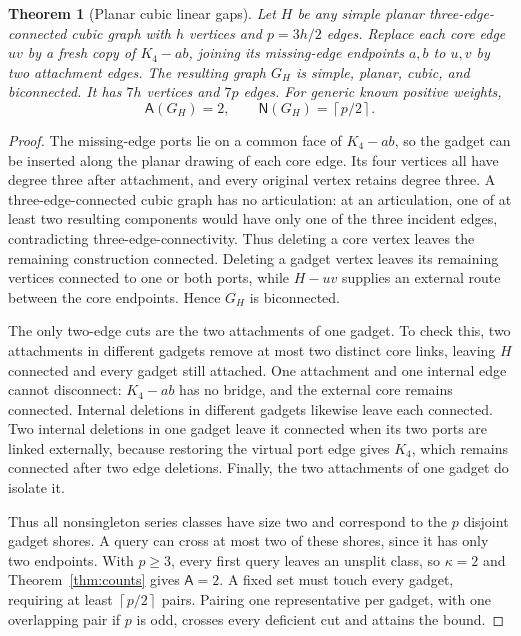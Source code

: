 \documentclass[11pt,letterpaper]{article}
\newtheorem{theorem}{Theorem}
\newcommand{\ceil}[1]{\left\lceil #1\right\rceil}
\newcommand{\A}{\mathsf A}
\newcommand{\N}{\mathsf N}
\begin{document}
\begin{theorem}[Planar cubic linear gaps]\label{thm:cubic}
Let $H$ be any simple planar three-edge-connected cubic graph with $h$ vertices and $p=3h/2$ edges. Replace each core edge $uv$ by a fresh copy of $K_4-ab$, joining its missing-edge endpoints $a,b$ to $u,v$ by two attachment edges. The resulting graph $G_H$ is simple, planar, cubic, and biconnected. It has $7h$ vertices and $7p$ edges. For generic known positive weights,
\[
 \A(G_H)=2,\qquad \N(G_H)=\ceil{p/2}.
\]
\end{theorem}
\begin{proof}
The missing-edge ports lie on a common face of $K_4-ab$, so the gadget can be inserted along the planar drawing of each core edge. Its four vertices all have degree three after attachment, and every original vertex retains degree three. A three-edge-connected cubic graph has no articulation: at an articulation, one of at least two resulting components would have only one of the three incident edges, contradicting three-edge-connectivity. Thus deleting a core vertex leaves the remaining construction connected. Deleting a gadget vertex leaves its remaining vertices connected to one or both ports, while $H-uv$ supplies an external route between the core endpoints. Hence $G_H$ is biconnected.

The only two-edge cuts are the two attachments of one gadget. To check this, two attachments in different gadgets remove at most two distinct core links, leaving $H$ connected and every gadget still attached. One attachment and one internal edge cannot disconnect: $K_4-ab$ has no bridge, and the external core remains connected. Internal deletions in different gadgets likewise leave each connected. Two internal deletions in one gadget leave it connected when its two ports are linked externally, because restoring the virtual port edge gives $K_4$, which remains connected after two edge deletions. Finally, the two attachments of one gadget do isolate it.

Thus all nonsingleton series classes have size two and correspond to the $p$ disjoint gadget shores. A query can cross at most two of these shores, since it has only two endpoints. With $p\ge3$, every first query leaves an unsplit class, so $\kappa=2$ and Theorem~\ref{thm:counts} gives $\A=2$. A fixed set must touch every gadget, requiring at least $\ceil{p/2}$ pairs. Pairing one representative per gadget, with one overlapping pair if $p$ is odd, crosses every deficient cut and attains the bound.
\end{proof}
\end{document}
